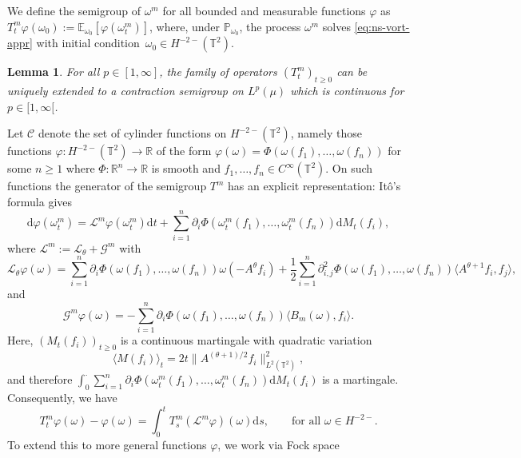 \documentclass{article}
\newcommand{\assign}{:=}
\newcommand{\mathd}{\mathrm{d}}
\newtheorem{lemma}{Lemma}
\begin{document}
We define the semigroup of $\omega^m$ for all bounded and measurable functions
$\varphi$ as $T^m_t \varphi (\omega_0) \assign \mathbb{E}_{\omega_0} [\varphi
(\omega_t^m)]$, where, under $\mathbb{P}_{\omega_0}$, the process $\omega^m$
solves {\eqref{eq:ns-vort-appr}} with initial condition~$\omega_0 \in H^{- 2
-} (\mathbb{T}^2)$.

\begin{lemma}
  \label{lem:semigroup}For all $p \in [1, \infty]$, the family of operators
  $(T^m_t)_{t \geqslant 0}$ can be uniquely extended to a contraction
  semigroup on $L^p (\mu)$ which is continuous for $p \in [1, \infty [$.
\end{lemma}

Let $\mathcal{C}$ denote the set of cylinder functions on $H^{- 2 -}
(\mathbb{T}^2)$, namely those functions $\varphi : H^{- 2 -} (\mathbb{T}^2)
\rightarrow \mathbb{R}$ of the form $\varphi (\omega) = \Phi (\omega (f_1),
\ldots, \omega (f_n))$ for some $n \geqslant 1$ where $\Phi : \mathbb{R}^n
\rightarrow \mathbb{R}$ is smooth and $f_1, \ldots, f_n \in C^{\infty}
(\mathbb{T}^2)$. On such functions the generator of the semigroup $T^m$ has an
explicit representation: It{\^o}'s formula gives
\begin{equation}
  \mathd \varphi (\omega_t^m) =\mathcal{L}^m \varphi (\omega^m_t) \mathd t +
  \sum_{i = 1}^n \partial_i \Phi (\omega_t^m (f_1), \ldots, \omega_t^m (f_n))
  \mathd M_t (f_i), \label{eq:ito-cyl}
\end{equation}
where $\mathcal{L}^m \assign \mathcal{L}_{\theta} +\mathcal{G}^m$ with
\[ \mathcal{L}_{\theta} \varphi (\omega) = \sum_{i = 1}^n \partial_i \Phi
   (\omega (f_1), \ldots, \omega (f_n)) \omega (- A^{\theta} f_i) +
   \frac{1}{2} \sum_{i = 1}^n \partial_{i, j}^2 \Phi (\omega (f_1), \ldots,
   \omega (f_n)) \langle A^{\theta + 1} f_i, f_j \rangle, \]
and
\[ \mathcal{G}^m \varphi (\omega) = - \sum_{i = 1}^n \partial_i \Phi (\omega
   (f_1), \ldots, \omega (f_n)) \langle B_m (\omega), f_i \rangle . \]
Here, $(M_t (f_i))_{t \geqslant 0}$ is a continuous martingale with quadratic
variation
\[ \langle M (f_i) \rangle_t = 2 t \| A^{(\theta + 1) / 2} f_i \|_{L^2
   (\mathbb{T}^2)}^2, \]
and therefore $\int_0^{\cdot} \sum_{i = 1}^n \partial_i \Phi (\omega_t^m
(f_1), \ldots, \omega_t^m (f_n)) \mathd M_t (f_i)$ is a martingale.
Consequently, we have
\[ T^m_t \varphi (\omega) - \varphi (\omega) = \int_0^t T^m_s (\mathcal{L}^m
   \varphi) (\omega) \mathd s, \qquad \text{for all } \omega \in H^{- 2 -} .
\]
To extend this to more general functions $\varphi$, we work via Fock space
\end{document}
